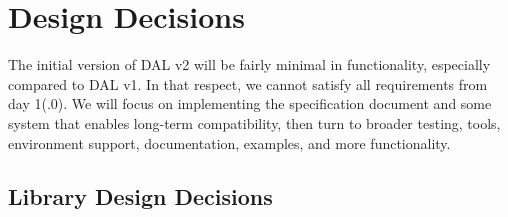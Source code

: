\documentclass[a4paper,11pt]{article}
\begin{document}

\section{Design Decisions} \label{sec:design_decisions}
The initial version of DAL v2 will be fairly minimal in functionality, especially compared to DAL v1.
In that respect, we cannot satisfy all requirements from day 1(.0).
We will focus on implementing the specification document and some system that enables long-term compatibility, then turn to broader testing, tools, environment support, documentation, examples, and more functionality.


\subsection{Library Design Decisions} \label{sec:lib_design_decisions}
\end{document}
